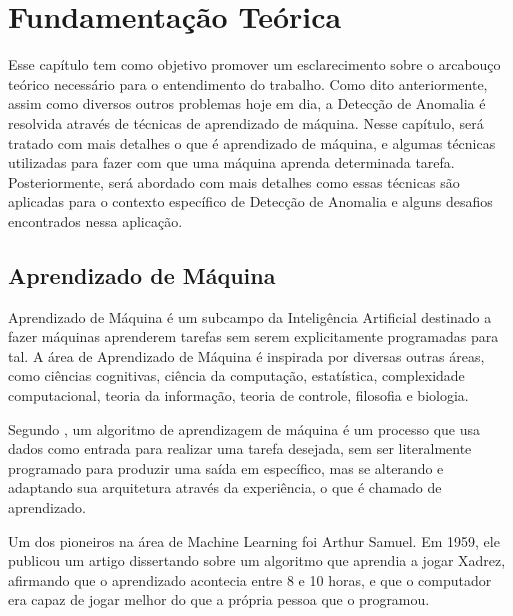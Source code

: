 \chapter{Fundamentação Teórica}\label{chp:FUNDAMENTACAO_TEORICA}

Esse capítulo tem como objetivo promover um esclarecimento sobre o arcabouço teórico necessário para o entendimento do trabalho. Como dito anteriormente, assim como diversos outros problemas hoje em dia, a Detecção de Anomalia é resolvida através de técnicas de aprendizado de máquina. Nesse capítulo, será tratado com mais detalhes o que é aprendizado de máquina, e algumas técnicas utilizadas para fazer com que uma máquina aprenda determinada tarefa. Posteriormente, será abordado com mais detalhes como essas técnicas são aplicadas para o contexto específico de Detecção de Anomalia e alguns desafios encontrados nessa aplicação.


\section{Aprendizado de Máquina}
Aprendizado de Máquina é um subcampo da Inteligência Artificial destinado a fazer máquinas aprenderem tarefas sem serem explicitamente programadas para tal. A área de Aprendizado de Máquina é inspirada por diversas outras áreas, como ciências cognitivas, ciência da computação, estatística, complexidade computacional, teoria da informação, teoria de controle, filosofia e biologia. \cite{machine_learning_yao_liu}

Segundo , um algoritmo de aprendizagem de máquina é um processo que usa dados como entrada para realizar uma tarefa desejada, sem ser literalmente programado para produzir uma saída em específico, mas se alterando e adaptando sua arquitetura através da experiência, o que é chamado de aprendizado.

Um dos pioneiros na área de Machine Learning foi Arthur Samuel. Em 1959, ele publicou um artigo dissertando sobre um algoritmo que aprendia a jogar Xadrez, afirmando que o aprendizado acontecia entre 8 e 10 horas, e que o computador era capaz de jogar melhor do que a própria pessoa que o programou. \cite{arthur_samuel_xadrez}

